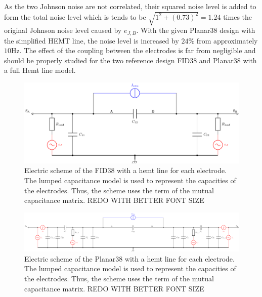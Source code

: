 As the two Johnson noise are not correlated, their squared noise level is added to form the total noise level which is tends to be $\sqrt{1^2 + (0.73)^2} = 1.24$ times the original Johnson noise level caused by $e_{J,B}$. With the given Planar38 design with the simplified HEMT line, the noise level is increased by $24\%$ from approximately $10$Hz. The effect of the coupling between the electrodes is far from negligible and should be properly studied for the two reference design FID38 and Planar38 with a full Hemt line model.

\begin{landscape}
\begin{figure}
\centering
\includegraphics[height=0.25\textheight, width=\linewidth, keepaspectratio]{Figures/Electrodes/scheme_planar38_analytical.png}
\caption{Electric scheme of the FID38 with a hemt line for each electrode. The lumped capacitance model is used to represent the capacities of the electrodes. Thus, the scheme uses the term of the mutual capacitance matrix. REDO WITH BETTER FONT SIZE}
\label{fig:scheme-planar38-simplified}
\end{figure}

\begin{figure}
\centering
\includegraphics[height=0.25\textheight, width=\linewidth, keepaspectratio]{Figures/Electrodes/scheme_planar38.png}
\caption{Electric scheme of the Planar38 with a hemt line for each electrode. The lumped capacitance model is used to represent the capacities of the electrodes. Thus, the scheme uses the term of the mutual capacitance matrix. REDO WITH BETTER FONT SIZE}
\label{fig:scheme-planar38-full}
\end{figure}
\end{landscape}

